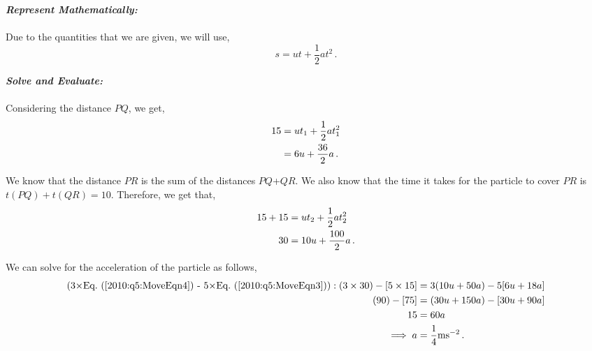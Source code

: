 \begin{subquestions}
\begin{subsubquestions}
\textbf{\textit{Represent Mathematically:}} \\ \\
Due to the quantities that we are given, we will use,
\begin{equation}
	s = ut + \frac{1}{2}at^2 \,.
\end{equation}




\textbf{\textit{Solve and Evaluate:}} \\ \\
Considering the distance $PQ$, we get,
\begin{align}
	15 & = ut_1 + \frac{1}{2}at_1^2 \nonumber \\
	& = 6u + \frac{36}{2}a \,. \label{2010:q5:MoveEqn3}
\end{align}

We know that the distance $PR$ is the sum of the distances $PQ$+$QR$. We also know that the time it takes for the particle to cover $PR$ is $t(PQ)+t(QR)=10$. Therefore, we get that,
\begin{align}
	15+15 & = ut_2 + \frac{1}{2}at_2^2 \nonumber \\
	30 & = 10u + \frac{100}{2}a \,. \label{2010:q5:MoveEqn4}
\end{align}

We can solve for the acceleration of the particle as follows,
\begin{align}
	(\text{3$\times$\req{2010:q5:MoveEqn4} - 5$\times$\req{2010:q5:MoveEqn3}}): (3 \times 30) - [5 \times 15] & = 3(10u+50a) - 5[6u+18a] \nn \\
                                                                                                    (90)-[75] & = (30u+150a)-[30u+90a] \nn \\
                                                                                                           15 & = 60a \nn \\
                                                                                                           \implies a & = \frac{1}{4}\text{ms}^{-2} \,.
\end{align}



\end{subsubquestions}
\end{subquestions}
